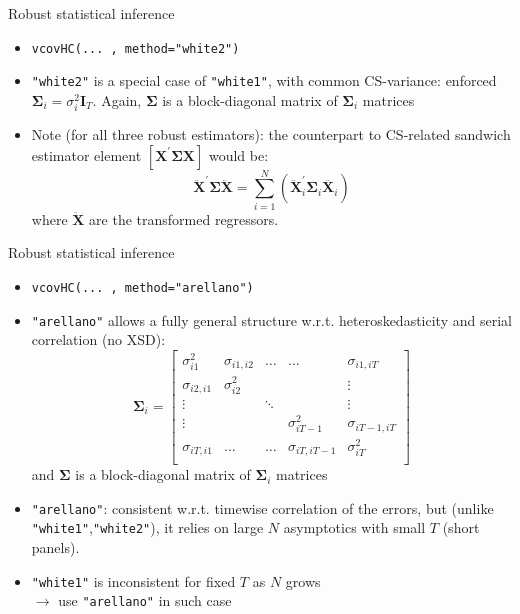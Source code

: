 \documentclass[usenames,dvipsnames]{beamer}
\begin{document}
\begin{frame}{Robust statistical inference}
\begin{itemize}
    \item \texttt{vcovHC(... , method="white2")}
    \medskip
    \item \texttt{"white2"} is a special case of \texttt{"white1"}, with common CS-variance: enforced $\bm{\Sigma}_i = \sigma^2_i \bm{I}_T$. Again, $\bm{\Sigma}$ is a block-diagonal matrix of $\bm{\Sigma}_i$ matrices
    \vspace{1.5cm}
    \item Note (for all three robust estimators): the counterpart to CS-related sandwich estimator element $\left[ \bm{X}^{\prime} \bm{\Sigma} \bm{X} \right]$ would be:
    $$
    \ddot{\bm{X}}^{\prime} \bm{\Sigma} \ddot{\bm{X}} = 
    \sum_{i=1}^N \left( 
    \ddot{\bm{X}}_i^{\prime} \bm{\Sigma}_i \ddot{\bm{X}_i}
    \right)
    $$
    where $\ddot{\bm{X}}$ are the transformed regressors.\\ 
\end{itemize}
\end{frame}
\begin{frame}{Robust statistical inference}
\begin{itemize}
    \item \texttt{vcovHC(... , method="arellano")}
    \medskip
    \item \texttt{"arellano"} allows a fully general structure w.r.t. heteroskedasticity and serial correlation (no XSD):
    $$
    \bm{\Sigma}_i = 
    \begin{bmatrix}
    \sigma_{i1}^2 & \sigma_{i1,i2} & \dots & \dots & \sigma_{i1,iT} \\
    \sigma_{i2,i1} & \sigma_{i2}^2 &       &       & \vdots \\
    \vdots         &               & \ddots &      & \vdots \\
   \vdots         &               &  &  \sigma_{iT-1}^2    & \sigma_{iT-1,iT} \\
   \sigma_{iT,i1}       &   \dots & \dots    &  \sigma_{iT,iT-1}    & \sigma_{iT}^2 \\
    \end{bmatrix}
    $$
    and $\bm{\Sigma}$ is a block-diagonal matrix of $\bm{\Sigma}_i$ matrices
    \smallskip
    \item \texttt{"arellano"}: consistent w.r.t. timewise correlation of the errors, but (unlike \texttt{"white1"},\texttt{"white2"}), it relies on large $N$ asymptotics with small $T$ (short panels).
    \smallskip
    \item \texttt{"white1"} is inconsistent for fixed $T$ as $N$ grows \\$\rightarrow$ use \texttt{"arellano"} in such case 
\end{itemize}
\end{frame}
\end{document}
